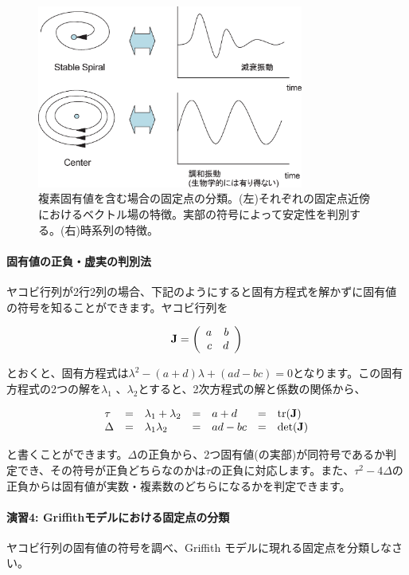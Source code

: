 \begin{figure}[ht]
        \centering \includegraphics[height=6cm]{../Bifurcation/img/spiral_stability.eps}
        \caption{複素固有値を含む場合の固定点の分類。(左)それぞれの固定点近傍におけるベクトル場の特徴。実部の符号によって安定性を判別する。(右)時系列の特徴。}
        \label{fig:08bsysbio} \end{figure}


\paragraph{固有値の正負・虚実の判別法}
ヤコビ行列が2行2列の場合、下記のようにすると固有方程式を解かずに固有値の符号を知ることができます。ヤコビ行列を

\[{\bf J} =
\left(
\begin{array}{rr}
a& b\\
c& d\\
\end{array}
\right)
\]

とおくと、固有方程式は\(\lambda^2-(a+d)\lambda+(ad-bc)=0\)となります。この固有方程式の2つの解を\(\lambda_1\) 、\(\lambda_2\)とすると、2次方程式の解と係数の関係から、

\[
\begin{array}{lclclcl}
\tau & = & \lambda_1 + \lambda_2 & = & a + d & = & {\rm tr}({\bf J})\\
\Delta & = &\lambda_1 \lambda_2 & = & ad - bc & = & \det({\bf J})\\
\end{array}
\]

と書くことができます。\(\Delta\)の正負から、2つ固有値(の実部)が同符号であるか判定でき、その符号が正負どちらなのかは\(\tau\)の正負に対応します。また、\(\tau^2 -4\Delta\)の正負からは固有値が実数・複素数のどちらになるかを判定できます。


\paragraph{演習4:  Griffithモデルにおける固定点の分類}
ヤコビ行列の固有値の符号を調べ、Griffith モデルに現れる固定点を分類しなさい。

